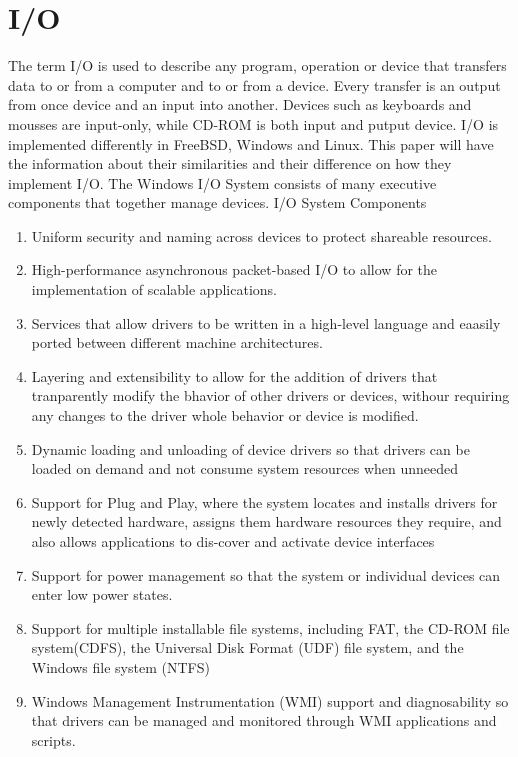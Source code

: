 \documentclass[letterpaper,10pt,draftclsnofoot,onecolumn]{IEEEtran}
\begin{document}
\section*{I/O}
The term I/O is used to describe any program, operation or device that transfers data to or from a computer and to or from a device. Every transfer is an output from once device and an input into another. Devices such as keyboards and mousses are input-only, while CD-ROM is both input and putput device. I/O is implemented differently in FreeBSD, Windows and Linux. This paper will have the information about their similarities and their difference on how they implement I/O.
The Windows I/O System consists of many executive components that together manage devices. 
I/O System Components
\begin{enumerate}
\item Uniform security and naming across devices to protect shareable resources.
\item High-performance asynchronous packet-based I/O to allow for the implementation of scalable applications.
\item Services that allow drivers to be written in a high-level language and eaasily ported between different machine architectures.
\item Layering and extensibility to allow for the addition of drivers that tranparently modify the bhavior of other drivers or devices, withour requiring any changes to the driver whole behavior or device is modified.
\item Dynamic loading and unloading of device drivers so that drivers can be loaded on demand and not consume system resources when unneeded
\item Support for Plug and Play, where the system locates and installs drivers for newly detected hardware, assigns them hardware resources they require, and also allows applications to dis-cover and activate device interfaces
\item Support for power management so that the system or individual devices can enter low power states.
\item Support for multiple installable file systems, including FAT, the CD-ROM file system(CDFS), the Universal Disk Format (UDF) file system, and the Windows file system (NTFS)
\item Windows Management Instrumentation (WMI) support and diagnosability so that drivers can be managed and monitored through WMI applications and scripts.\cite{[1]}
\end{enumerate}
\end{document}
